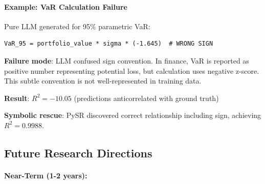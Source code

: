 \documentclass[twoside,11pt]{article}
\begin{document}
\paragraph{Example: VaR Calculation Failure}

Pure LLM generated for 95\% parametric VaR:
\begin{verbatim}
VaR_95 = portfolio_value * sigma * (-1.645)  # WRONG SIGN
\end{verbatim}

\textbf{Failure mode}: LLM confused sign convention. In finance, VaR is reported as positive number representing potential loss, but calculation uses negative z-score. This subtle convention is not well-represented in training data\citep{lewkowycz2022minerva}.

\textbf{Result}: $R^2 = -10.05$ (predictions anticorrelated with ground truth)

\textbf{Symbolic rescue}: PySR discovered correct relationship including sign, achieving $R^2 = 0.9988$.

\subsection{Future Research Directions}
\label{sec:future_work}

\paragraph{Near-Term (1-2 years):}
\end{document}
